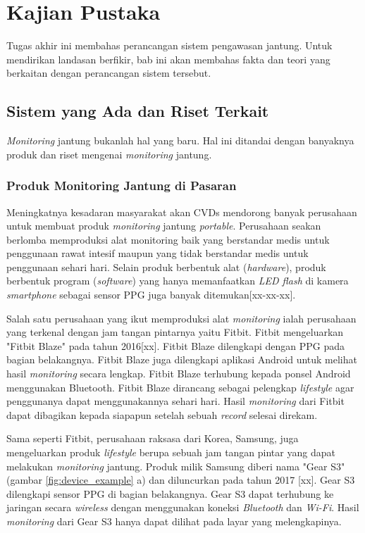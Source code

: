 \chapter{Kajian Pustaka}
Tugas akhir ini membahas perancangan sistem pengawasan jantung. Untuk mendirikan landasan berfikir, bab ini akan membahas fakta dan teori yang berkaitan dengan perancangan sistem tersebut.

\section{Sistem yang Ada dan Riset Terkait}
\textit{Monitoring} jantung bukanlah hal yang baru. Hal ini ditandai dengan banyaknya produk dan riset mengenai \textit{monitoring} jantung.

\subsection{Produk Monitoring Jantung di Pasaran}
Meningkatnya kesadaran masyarakat akan CVDs mendorong banyak perusahaan untuk membuat produk \textit{monitoring} jantung \textit{portable}. Perusahaan seakan berlomba memproduksi alat monitoring baik yang berstandar medis untuk penggunaan rawat intesif maupun yang tidak berstandar medis untuk penggunaan sehari hari. Selain produk berbentuk alat (\textit{hardware}), produk berbentuk program (\textit{software}) yang hanya memanfaatkan \textit{LED flash} di kamera \textit{smartphone} sebagai sensor PPG juga banyak ditemukan[xx-xx-xx].

Salah satu perusahaan yang ikut memproduksi alat \textit{monitoring} ialah perusahaan yang terkenal dengan jam tangan pintarnya yaitu Fitbit. Fitbit mengeluarkan "Fitbit Blaze" pada tahun 2016[xx]. Fitbit Blaze dilengkapi dengan PPG pada bagian belakangnya. Fitbit Blaze juga dilengkapi aplikasi Android untuk melihat hasil \textit{monitoring} secara lengkap. Fitbit Blaze terhubung kepada ponsel Android menggunakan Bluetooth. Fitbit Blaze dirancang sebagai pelengkap \textit{lifestyle} agar penggunanya dapat menggunakannya sehari hari. Hasil \textit{monitoring} dari Fitbit dapat dibagikan kepada siapapun setelah sebuah \textit{record} selesai direkam.

Sama seperti Fitbit, perusahaan raksasa dari Korea, Samsung, juga mengeluarkan produk \textit{lifestyle} berupa sebuah jam tangan pintar yang dapat melakukan \textit{monitoring} jantung. Produk milik Samsung diberi nama "Gear S3" (gambar \ref{fig:device_example} a) dan diluncurkan pada tahun 2017 [xx]. Gear S3 dilengkapi sensor PPG di bagian belakangnya. Gear S3 dapat terhubung ke jaringan secara \textit{wireless} dengan menggunakan koneksi \textit{Bluetooth} dan \textit{Wi-Fi}. Hasil \textit{monitoring} dari Gear S3 hanya dapat dilihat pada layar yang melengkapinya.


